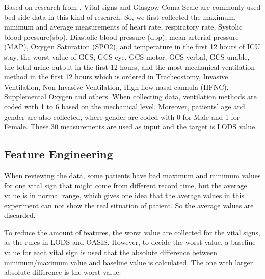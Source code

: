 \documentclass[12pt,a4paper,english
]{tunithesis}
\begin{document}
Based on research from \textcite{asuroglu2021, johnson2013}, Vital signs and Glasgow Coma Scale are commonly used bed side data in this kind of research. So, we first collected the maximum, minimum and average measurements of heart rate, respiratory rate, Systolic blood pressure(sbp), Diastolic blood pressure (dbp), mean arterial pressure (MAP), Oxygen Saturation (SPO2), and temperature in the first 12 hours of ICU stay, the worst value of GCS, GCS eye, GCS motor, GCS verbal, GCS unable, the total urine output in the first 12 hours, and the most mechanical ventilation method in the first 12 hours which is ordered in Tracheostomy, Invasive Ventilation, Non Invasive Ventilation, High-flow nasal cannula (HFNC), Supplemental Oxygen and others. When collecting data, ventilation methods are coded with 1 to 6 based on the mechanical level. Moreover, patients' age and gender are also collected, where gender are coded with 0 for Male and 1 for Female.  These 30 measurements are used as input and the target is LODS value. 

\subsection{Feature Engineering}
When reviewing the data, some patients have bad maximum and minimum values for one vital sign that might come from different record time, but the average value is in normal range, which gives one idea that the average values in this experiment can not show the real situation of patient. So the average values are discarded.

To reduce the amount of features, the worst value are collected for the vital signs, as the rules in LODS and OASIS. However, to decide the worst value, a baseline value for each vital sign is used that the absolute difference between minimum/maximum value and baseline value is calculated. The one with larger absolute difference is the worst value. 
\end{document}
